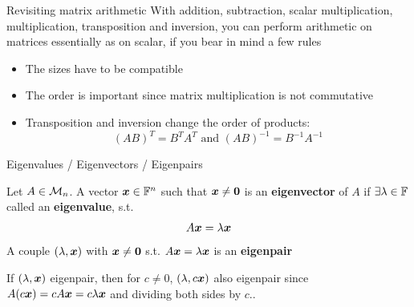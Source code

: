 \documentclass[aspectratio=169]{beamer}\usepackage[]{graphicx}\usepackage[]{xcolor}
\begin{document}
\begin{frame}{Revisiting matrix arithmetic}
With addition, subtraction, scalar multiplication, multiplication, transposition and inversion, you can perform arithmetic on matrices essentially as on scalar, if you bear in mind a few rules
\begin{itemize}
\item The sizes have to be compatible
\item The order is important since matrix multiplication is not commutative
\item Transposition and inversion change the order of products:
\[
(AB)^T=B^TA^T\textrm{ and }(AB)^{-1}=B^{-1}A^{-1}
\]
\end{itemize}
\end{frame}



\begin{frame}{Eigenvalues / Eigenvectors / Eigenpairs}
\begin{definition}
Let $A\in\mathcal{M}_n$. A vector $\bm{x}\in\mathbb{F}^n$ such that $\bx\neq\b0$ is an \textbf{eigenvector} of $A$ if $\exists\lambda\in\mathbb{F}$ called an \textbf{eigenvalue}, s.t.
\[
A\bm{x}=\lambda \bm{x}
\]
A couple $(\lambda,\bm{x})$ with $\bx\neq\b0$ s.t. $A\bm{x}=\lambda\bm{x}$ is an \textbf{eigenpair}
\end{definition}
If $(\lambda,\bm{x})$ eigenpair, then for $c\neq 0$, $(\lambda,c\bm{x})$ also eigenpair since $A(c\bm{x})=cA\bm{x}=c\lambda\bm{x}$ and dividing both sides by $c$..
\end{frame}
\end{document}
